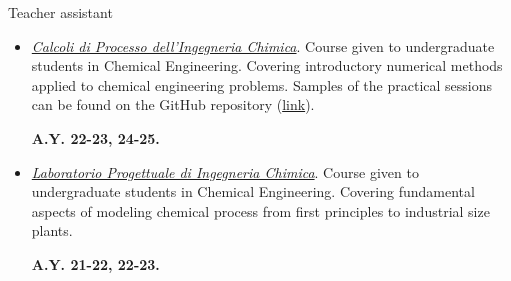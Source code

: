 \begin{position_simple}{Teacher assistant}{\polimi}
\begin{itemize}

   \item[ ]
      \begin{minipage}[t]{0.75\textwidth}
        \ul{\it Calcoli di Processo dell'Ingegneria Chimica}. Course given to
        undergraduate students in Chemical Engineering. Covering introductory numerical
        methods applied to chemical engineering problems. Samples of the practical sessions
        can be found on the GitHub repository
        (\href{https://github.com/Titodinelli/Calcoli-di-Processo-dell-Ingegneria-Chimica}{link}).
      \end{minipage}
      \begin{minipage}[t]{0.18\textwidth}
         \begin{flushright}
            \bfseries A.Y. 22-23, 24-25.
         \end{flushright}
      \end{minipage}

   \item[ ]
      \begin{minipage}[t]{0.75\textwidth}
      \ul{\it Laboratorio Progettuale di Ingegneria Chimica}. Course given to
      undergraduate students in Chemical Engineering. Covering fundamental aspects of
      modeling chemical process from first principles to industrial size plants.
      \end{minipage}
      \begin{minipage}[t]{0.18\textwidth}
         \begin{flushright}
            \bfseries A.Y. 21-22, 22-23.
         \end{flushright}
      \end{minipage}
\end{itemize}
\end{position_simple}


